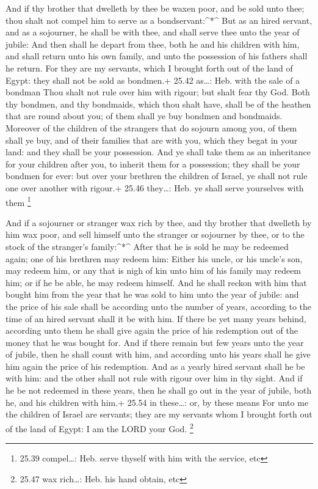 And if thy brother that dwelleth by thee be waxen poor,
and be sold unto thee; thou shalt not compel him to serve as a
bondservant:\^{}*\^{}  But as an hired servant, and as a
sojourner, he shall be with thee, and shall serve thee unto the year of
jubile:  And then shall he depart from thee, both he and
his children with him, and shall return unto his own family, and unto
the possession of his fathers shall he return.  For they
are my servants, which I brought forth out of the land of Egypt: they
shall not be sold as bondmen.+ 25.42 as\ldots: Heb. with the sale of a
bondman  Thou shalt not rule over him with rigour; but
shalt fear thy God.  Both thy bondmen, and thy bondmaids,
which thou shalt have, shall be of the heathen that are round about you;
of them shall ye buy bondmen and bondmaids.  Moreover of
the children of the strangers that do sojourn among you, of them shall
ye buy, and of their families that are with you, which they begat in
your land: and they shall be your possession.  And ye shall
take them as an inheritance for your children after you, to inherit them
for a possession; they shall be your bondmen for ever: but over your
brethren the children of Israel, ye shall not rule one over another with
rigour.+ 25.46 they\ldots: Heb. ye shall serve yourselves with them
\footnote{25.39 compel\ldots: Heb. serve thyself with him with the
  service, etc}

 And if a sojourner or stranger wax rich by thee, and thy
brother that dwelleth by him wax poor, and sell himself unto the
stranger or sojourner by thee, or to the stock of the stranger's
family:\^{}*\^{}  After that he is sold he may be redeemed
again; one of his brethren may redeem him:  Either his
uncle, or his uncle's son, may redeem him, or any that is nigh of kin
unto him of his family may redeem him; or if he be able, he may redeem
himself.  And he shall reckon with him that bought him from
the year that he was sold to him unto the year of jubile: and the price
of his sale shall be according unto the number of years, according to
the time of an hired servant shall it be with him.  If
there be yet many years behind, according unto them he shall give again
the price of his redemption out of the money that he was bought for.
 And if there remain but few years unto the year of jubile,
then he shall count with him, and according unto his years shall he give
him again the price of his redemption.  And as a yearly
hired servant shall he be with him: and the other shall not rule with
rigour over him in thy sight.  And if he be not redeemed in
these years, then he shall go out in the year of jubile, both he, and
his children with him.+ 25.54 in these\ldots: or, by these means
 For unto me the children of Israel are servants; they are
my servants whom I brought forth out of the land of Egypt: I am the LORD
your God. \footnote{25.47 wax rich\ldots: Heb. his hand obtain, etc}

